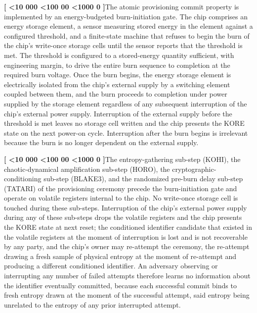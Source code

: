 \documentclass[12pt,letterpaper]{article}
\newcounter{para}
\newcommand{\padzero}{%
  \ifnum\value{para}<10 000\else%
  \ifnum\value{para}<100 00\else%
  \ifnum\value{para}<1000 0\else%
  \fi\fi\fi}
\newcommand{\para}{%
  \refstepcounter{para}\noindent\textbf{[\padzero\arabic{para}]}\hspace{0.5em}\ignorespaces}
\newcounter{fig}
\begin{document}
\para The atomic provisioning commit property is implemented by an energy-budgeted burn-initiation gate. The chip comprises an energy storage element, a sensor measuring stored energy in the element against a configured threshold, and a finite-state machine that refuses to begin the burn of the chip's write-once storage cells until the sensor reports that the threshold is met. The threshold is configured to a stored-energy quantity sufficient, with engineering margin, to drive the entire burn sequence to completion at the required burn voltage. Once the burn begins, the energy storage element is electrically isolated from the chip's external supply by a switching element coupled between them, and the burn proceeds to completion under power supplied by the storage element regardless of any subsequent interruption of the chip's external power supply. Interruption of the external supply before the threshold is met leaves no storage cell written and the chip presents the KORE state on the next power-on cycle. Interruption after the burn begins is irrelevant because the burn is no longer dependent on the external supply.

\para The entropy-gathering sub-step (KOHI), the chaotic-dynamical amplification sub-step (HORO), the cryptographic-conditioning sub-step (BLAKE3), and the randomized pre-burn delay sub-step (TATARI) of the provisioning ceremony precede the burn-initiation gate and operate on volatile registers internal to the chip. No write-once storage cell is touched during these sub-steps. Interruption of the chip's external power supply during any of these sub-steps drops the volatile registers and the chip presents the KORE state at next reset; the conditioned identifier candidate that existed in the volatile registers at the moment of interruption is lost and is not recoverable by any party, and the chip's owner may re-attempt the ceremony, the re-attempt drawing a fresh sample of physical entropy at the moment of re-attempt and producing a different conditioned identifier. An adversary observing or interrupting any number of failed attempts therefore learns no information about the identifier eventually committed, because each successful commit binds to fresh entropy drawn at the moment of the successful attempt, said entropy being unrelated to the entropy of any prior interrupted attempt.
\end{document}
